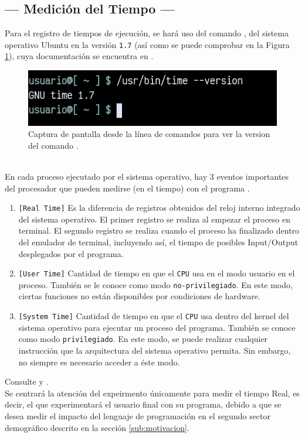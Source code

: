 \documentclass[11pt,a4paper]{article}
\begin{document}

\subsection{--- Medición del Tiempo ---} %
\label{sub:medicion_tiempo}
Para el registro de tiempos de ejecución, se hará uso del comando , del sistema operativo Ubuntu en la versión \texttt{1.7} (así como se puede comprobar en la Figura \ref{fig:time}), cuya documentación se encuentra en .
\begin{figure}[hbt!]
	\centering
	\includegraphics[width= 0.4 \linewidth]{IMAGENES/3/time.png}
	\caption{Captura de pantalla desde la línea de comandos para ver la version del comando .}
	\label{fig:time}
\end{figure}\\
En cada proceso ejecutado por el sistema operativo, hay 3 eventos importantes del procesador que pueden medirse (en el tiempo) con el programa .
\begin{enumerate}[noitemsep]
	\item \texttt{[Real Time]} Es la diferencia de registros obtenidos del reloj interno integrado del sistema operativo. El primer registro se realiza al empezar el proceso en terminal. El segundo registro se realiza cuando el proceso ha finalizado dentro del emulador de terminal, incluyendo así, el tiempo de posibles Input\(/\)Output desplegados por el programa.
	\item \texttt{[User Time]} Cantidad de tiempo en que el \texttt{CPU} usa en el modo usuario en el proceso.
		También se le conoce como modo \texttt{no-privilegiado}.
		En este modo, ciertas funciones no están disponibles por condiciones de hardware.
	\item \texttt{[System Time]} Cantidad de tiempo en que el \texttt{CPU} usa dentro del kernel del sistema operativo para ejecutar un proceso del programa.
		También se conoce como modo \texttt{privilegiado}.
		En este modo, se puede realizar cualquier instrucción que la arquitectura del sistema operativo permita. Sin embargo, no siempre es necesario acceder a éste modo.
\end{enumerate}
Consulte  y . \\[2mm]
Se centrará la atención del expeirmento únicamente para medir el tiempo Real, es decir, el que experimentará el usuario final con su programa, debido a que se desea medir el impacto del lenguaje de programación en el segundo sector demográfico descrito en la sección \ref{sub:motivacion}.
\end{document}
